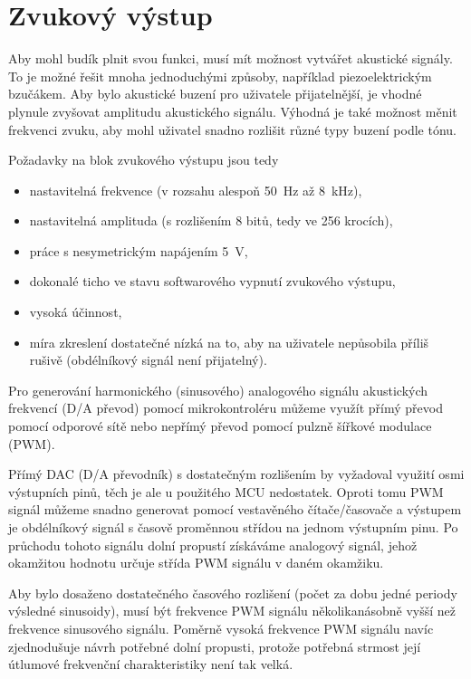 \section{Zvukový výstup}
Aby mohl budík plnit svou funkci, musí mít možnost vytvářet akustické signály.
To je možné řešit mnoha jednoduchými způsoby, například piezoelektrickým
bzučákem. Aby bylo akustické buzení pro uživatele přijatelnější, je vhodné
plynule zvyšovat amplitudu akustického signálu. Výhodná je také možnost měnit
frekvenci zvuku, aby mohl uživatel snadno rozlišit různé typy buzení podle
tónu.

Požadavky na blok zvukového výstupu jsou tedy
\begin{itemize}[nosep]
    \item nastavitelná frekvence (v rozsahu alespoň \SI{50}{\hertz} až
        \SI{8}{\kilo\hertz}),
    \item nastavitelná amplituda (s rozlišením 8 bitů, tedy ve 256 krocích),
    \item práce s nesymetrickým napájením \SI{5}{\volt},
    \item dokonalé ticho ve stavu softwarového vypnutí zvukového výstupu,
    \item vysoká účinnost,
    \item míra zkreslení dostatečné nízká na to, aby na uživatele nepůsobila
        příliš rušivě (obdélníkový signál není přijatelný).
\end{itemize}

Pro generování harmonického (sinusového) analogového signálu akustických
frekvencí (D/A převod) pomocí mikrokontroléru můžeme využít přímý převod pomocí
odporové sítě nebo nepřímý převod pomocí pulzně šířkové modulace (PWM).

Přímý DAC (D/A převodník) s dostatečným rozlišením by vyžadoval využití osmi
výstupních pinů, těch je ale u použitého MCU nedostatek. Oproti tomu PWM signál
můžeme snadno generovat pomocí vestavěného čítače/časovače a výstupem je
obdélníkový signál s časově proměnnou střídou na jednom výstupním pinu. Po
průchodu tohoto signálu dolní propustí získáváme analogový signál, jehož
okamžitou hodnotu určuje střída PWM signálu v daném okamžiku.

Aby bylo dosaženo dostatečného časového rozlišení (počet  za dobu
jedné periody výsledné sinusoidy), musí být frekvence PWM signálu
několikanásobně vyšší než frekvence sinusového signálu. Poměrně vysoká
frekvence PWM signálu navíc zjednodušuje návrh potřebné dolní propusti, protože
potřebná strmost její útlumové frekvenční charakteristiky není tak velká.

